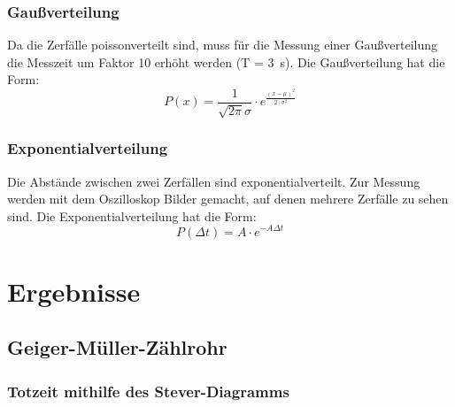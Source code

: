\documentclass[12pt,a4paper]{article}
\begin{document}
\subsubsection{Gaußverteilung}
Da die Zerfälle poissonverteilt sind, muss für die Messung einer Gaußverteilung die Messzeit um Faktor 10 erhöht werden (T = \SI{3}{s}). Die Gaußverteilung hat die Form:
\begin{equation}
P(x) = \dfrac{1}{\sqrt{2 \pi} \sigma} \cdot e^{\frac{(x - \mu)^2}{2 \cdot \sigma ^2}}
\end{equation}
\subsubsection{Exponentialverteilung}
Die Abstände zwischen zwei Zerfällen sind exponentialverteilt. Zur Messung werden mit dem Oszilloskop Bilder gemacht, auf denen mehrere Zerfälle zu sehen sind. Die Exponentialverteilung hat die Form:
\begin{equation}
P(\Delta t) = A \cdot e^{- A \Delta t}
\end{equation}
\newpage
\section{Ergebnisse}
\subsection{Geiger-Müller-Zählrohr}

\subsubsection{Totzeit mithilfe des Stever-Diagramms}
\end{document}
